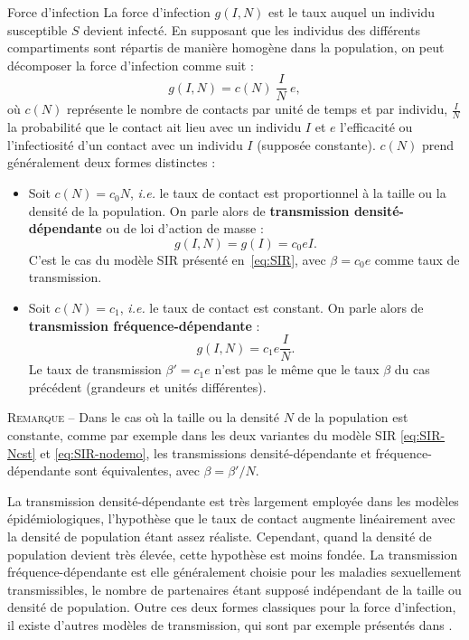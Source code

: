 \begin{encadre2}{Force d'infection}
\label{infection}
La force d'infection $g(I,N)$ est le taux auquel un individu susceptible $S$ devient infecté. En supposant que les individus des différents compartiments sont répartis de manière homogène dans la population, on  peut décomposer la force d'infection comme suit :
	  \begin{equation*}
	    g(I,N) = c(N) \: \frac{I}{N} \: e,
	  \end{equation*}
où $c(N)$ représente le nombre de contacts par unité de temps et par individu, $\frac{I}{N}$ la probabilité que le contact ait lieu avec un individu $I$ et $e$ l'efficacité ou l'infectiosité d'un contact avec un individu $I$ (supposée constante). $c(N)$ prend généralement deux formes distinctes :
	  \begin{itemize}
\item Soit $c(N)= c_0 N$, \textit{i.e.} le taux de contact est proportionnel à la taille ou la densité de la population. On parle alors de \textbf{transmission densité-dépendante} ou de loi d'action de masse :
	    \begin{equation*}
	      g(I,N) = g(I) = c_0 e I.
	    \end{equation*}
C'est le cas du modèle SIR présenté en~\eqref{eq:SIR}, avec $\beta=c_0 e$ comme taux de transmission.
\item Soit $c(N)= c_1$, \textit{i.e.} le taux de contact est constant. On parle alors de \textbf{transmission fréquence-dépendante} :
	    \begin{equation*}
	      g(I,N) = c_1 e \frac{I}{N}.
	    \end{equation*}
 Le taux de transmission $\beta'=c_1 e$ n'est pas le même que le taux $\beta$ du cas précédent (grandeurs et unités différentes). 
 \end{itemize}
{\small \textsc{Remarque --} Dans le cas où la taille ou la densité $N$ de la population est constante, comme par exemple dans les deux variantes du modèle SIR \eqref{eq:SIR-Ncst} et \eqref{eq:SIR-nodemo}, les transmissions densité-dépendante et fréquence-dépendante sont équivalentes, avec $\beta=\beta'/N$.}
\par\medskip
	  La transmission densité-dépendante est très largement employée dans les modèles épidémiologiques, l'hypothèse que le taux de contact augmente linéairement avec la densité de population étant assez réaliste. Cependant, quand la densité de population devient très élevée, cette hypothèse est moins fondée. La transmission fréquence-dépendante est elle généralement choisie pour les maladies sexuellement transmissibles, le nombre de partenaires étant supposé indépendant de la taille ou densité de population.  Outre ces deux formes classiques pour la force d'infection, il existe d'autres modèles de transmission, qui sont par exemple présentés dans \citet{McCallum2001}.  
	\end{encadre2}
	
